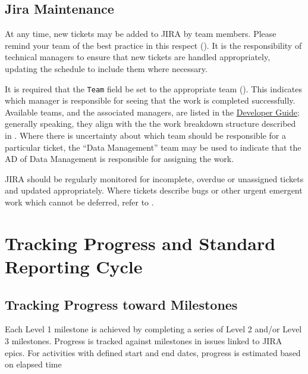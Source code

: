 \subsection{Jira Maintenance}
\label{sec:jira-maintenance}

At any time, new tickets may be added to \gls{JIRA} by team members.
Please remind your team of the best practice in this respect ().
It is the responsibility of technical managers to ensure that new tickets are handled appropriately, updating the schedule to include them where necessary.

It is required that the \texttt{Team} field be set to the appropriate team ().
This indicates which manager is responsible for seeing that the work is completed successfully.
Available teams, and the associated managers, are listed in the \href{https://developer.lsst.io/processes/jira_agile.html}{Developer Guide}; generally speaking, they align with the the work breakdown structure described in .
Where there is uncertainty about which team should be responsible for a particular ticket, the “Data Management” team may be used to indicate that the \gls{AD} of Data Management is responsible for assigning the work.

\gls{JIRA} should be regularly monitored for incomplete, overdue or unassigned tickets and updated appropriately.
Where tickets describe bugs or other urgent emergent work which cannot be deferred, refer to .



\section{Tracking Progress and Standard Reporting Cycle}
\label{sec:reporting-cycle}

\subsection{Tracking Progress toward Milestones}
\label{sec:track-progress}

Each Level 1 milestone is achieved by completing a series of Level 2 and/or Level 3 milestones.
Progress is tracked against milestones in issues linked to JIRA epics. For activities with defined
start and end dates, progress is estimated based on elapsed time

